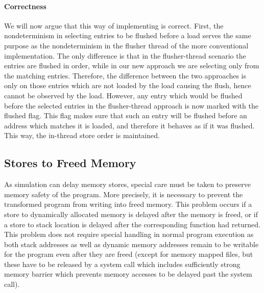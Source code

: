 \paragraph{Correctness}%
%
We will now argue that this way of implementing \xtso is correct.
First, the nondeterminism in selecting entries to be flushed before a load serves the same purpose as the nondeterminism in the flusher thread of the more conventional implementation.
The only difference is that in the flusher-thread scenario the entries are
flushed in order, while in our new approach we are selecting only from the matching entries.
Therefore, the difference between the two approaches is only on those entries
which are not loaded by the load causing the flush, hence cannot be observed by the load.
However, any entry which would be flushed before the selected entries in the flusher-thread approach is now marked with the flushed flag.
This flag makes sure that such an entry will be flushed before an address which matches it is loaded, and therefore it behaves as if it was flushed.
This way, the in-thread store order is maintained.

\subsection{Stores to Freed Memory}

As \xtso simulation can delay memory stores, special care must be taken to preserve memory safety of the program.
More precisely, it is necessary to prevent the transformed program from writing into freed memory.
This problem occurs if a store to dynamically allocated memory is delayed after the memory is freed, or if a store to stack location is delayed after the corresponding function had returned.
This problem does not require special handling in normal program execution as both stack addresses as well as dynamic memory addresses remain to be writable for the program even after they are freed (except for memory mapped files, but these have to be released by a system call which includes sufficiently strong memory barrier which prevents memory accesses to be delayed past the system call).

